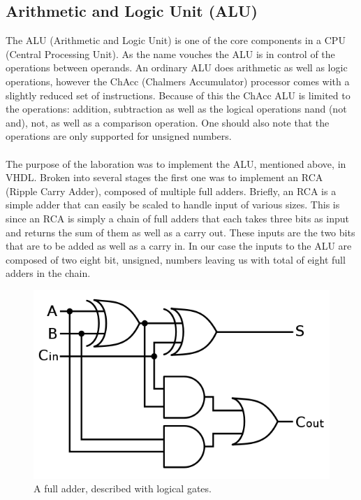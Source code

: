 \documentclass[a4paper,11pt]{article}
\begin{document}
\subsection{Arithmetic and Logic Unit (ALU)}
The ALU (Arithmetic and Logic Unit) is one of the core components in a CPU 
(Central Processing Unit). As the name vouches the ALU is in control of the 
operations between operands. An ordinary ALU does arithmetic as well as logic 
operations, however the ChAcc (Chalmers Accumulator) processor comes with a 
slightly reduced set of instructions. Because of this the ChAcc ALU is limited 
to the operations: addition, subtraction as well as the logical operations nand 
(not and), not, as well as a comparison operation. One should also note that 
the operations are only supported for unsigned numbers.\\\\
\noindent
The purpose of the laboration was to implement the ALU, mentioned above, in 
VHDL. Broken into several stages the first one was to implement an RCA (Ripple 
Carry Adder), composed of multiple full adders. Briefly, an RCA is a simple 
adder that can easily be scaled to handle input of various sizes. This is since 
an RCA is simply a chain of full adders that each takes three bits as input 
and returns the sum of them as well as a carry out. These inputs are the two 
bits that are to be added as well as a carry in. In our case the inputs to the 
ALU are composed of two eight bit, unsigned, numbers leaving us with total 
of eight full adders in the chain.\\

\begin{figure}[h]
    \centering
    \includegraphics[scale=0.25]{FA.png}
    \caption{A full adder, described with logical gates. ~\cite{fa}}
    \label{FA}
\end{figure}
\end{document}
